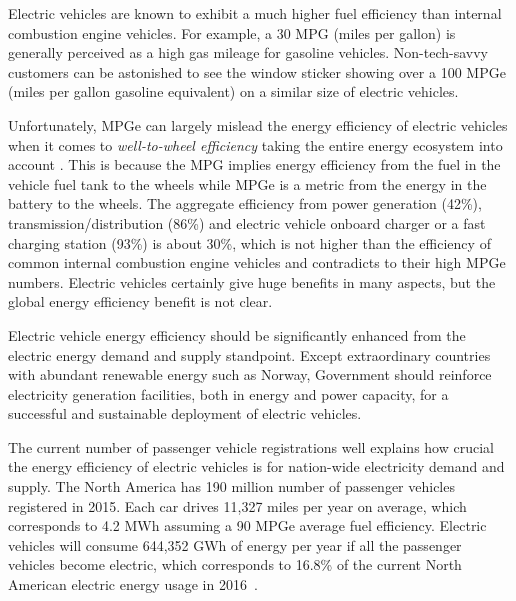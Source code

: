 \documentclass[journal]{IEEEtran}
\begin{document}
Electric vehicles are known to exhibit a much higher fuel efficiency than internal combustion engine vehicles. For example, a 30 MPG (miles per gallon) is generally perceived as a high gas mileage for gasoline vehicles. Non-tech-savvy customers can be astonished to see the window sticker showing over a 100 MPGe (miles per gallon gasoline equivalent) on a similar size of electric vehicles. 

Unfortunately, MPGe can largely mislead the energy efficiency of electric vehicles when it comes to \textit{well-to-wheel efficiency} taking the entire energy ecosystem into account  \cite{Campanari:JPS09}. This is because the MPG implies energy efficiency from the fuel in the vehicle fuel tank to the wheels while MPGe is a metric from the energy in the battery to the wheels. The aggregate efficiency from power generation (42\%), transmission/distribution (86\%) and electric vehicle onboard charger or a fast charging station (93\%) is about 30\%, which is not higher than the efficiency of common internal combustion engine vehicles \cite{Khaligh:TVT12} and contradicts to their high MPGe numbers. Electric vehicles certainly give huge benefits in many aspects, but the global energy efficiency benefit is not clear.



Electric vehicle energy efficiency should be significantly enhanced from the electric energy demand and supply standpoint. Except extraordinary countries with abundant renewable energy such as Norway, Government should reinforce electricity generation facilities, both in energy and power capacity, for a successful and sustainable deployment of electric vehicles. 

The current number of passenger vehicle registrations well explains how crucial the energy efficiency of electric vehicles is for nation-wide electricity demand and supply. The North America has 190 million number of passenger vehicles registered in 2015. Each car drives 11,327 miles per year on average, which corresponds to 4.2 MWh assuming a 90 MPGe average fuel efficiency. Electric vehicles will consume 644,352 GWh of energy per year if all the passenger vehicles become electric, which corresponds to 16.8\% of the current North American electric energy usage in 2016~\cite{FHWA, EIA}. 
\end{document}
